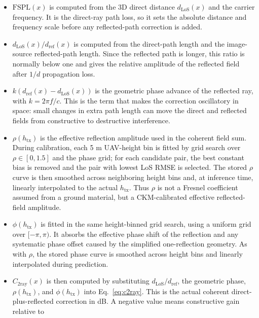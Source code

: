 \begin{itemize}
\item \(\mathrm{FSPL}(x)\) is computed from the 3D direct distance
      \(d_{\mathrm{LoS}}(x)\) and the carrier frequency. It is the
      direct-ray path loss, so it sets the absolute distance and frequency
      scale before any reflected-path correction is added.
\item \(d_{\mathrm{LoS}}(x)/d_{\mathrm{ref}}(x)\) is computed from the
      direct-path length and the image-source reflected-path length. Since the
      reflected path is longer, this ratio is normally below one and gives the
      relative amplitude of the reflected field after \(1/d\) propagation loss.
\item \(k(d_{\mathrm{ref}}(x)-d_{\mathrm{LoS}}(x))\) is the geometric phase
      advance of the reflected ray, with \(k=2\pi f/c\). This is the term that
      makes the correction oscillatory in space: small changes in extra path
      length can move the direct and reflected fields from constructive to
      destructive interference.
\item \(\rho(h_{\mathrm{tx}})\) is the effective reflection amplitude used in
      the coherent field sum. During calibration, each 5 m UAV-height bin is
      fitted by grid search over \(\rho\in[0,1.5]\) and the phase grid; for
      each candidate pair, the best constant bias is removed and the pair with
      lowest LoS RMSE is selected. The stored \(\rho\) curve is then smoothed
      across neighboring height bins and, at inference time, linearly
      interpolated to the actual \(h_{\mathrm{tx}}\). Thus \(\rho\) is not a
      Fresnel coefficient assumed from a ground material, but a CKM-calibrated
      effective reflected-field amplitude.
\item \(\phi(h_{\mathrm{tx}})\) is fitted in the same height-binned grid
      search, using a uniform grid over \([-\pi,\pi)\). It absorbs the
      effective phase shift of the reflection and any systematic phase offset
      caused by the simplified one-reflection geometry. As with \(\rho\), the
      stored phase curve is smoothed across height bins and linearly
      interpolated during prediction.
\item \(C_{\mathrm{2ray}}(x)\) is then computed by substituting
      \(d_{\mathrm{LoS}}/d_{\mathrm{ref}}\), the geometric phase,
      \(\rho(h_{\mathrm{tx}})\), and \(\phi(h_{\mathrm{tx}})\) into
      Eq.~\eqref{eq:c2ray}. This is the actual coherent direct-plus-reflected
      correction in dB. A negative value means constructive gain relative to

\end{itemize}
